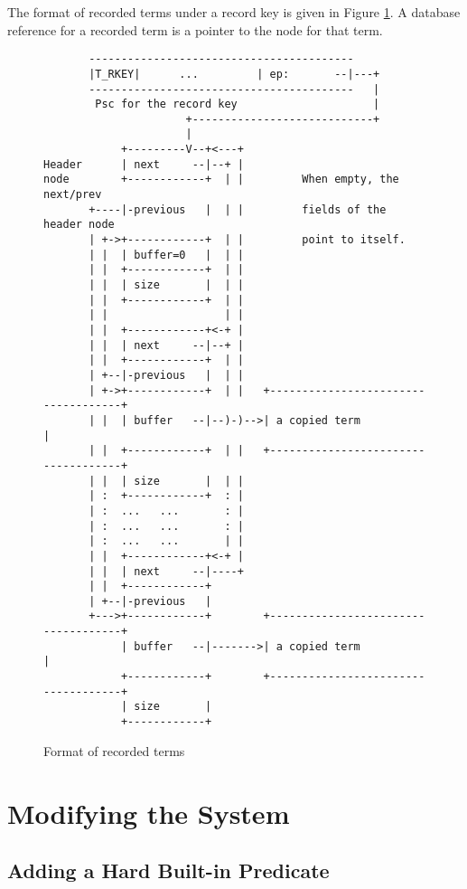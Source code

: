 \documentclass[11pt]{article}
\begin{document}
The format of recorded terms under a record key is given in Figure
\ref{f:record}.
A database reference for a recorded term
is a pointer to the node for that term.

\begin{figure}
\begin{verbatim}
       -----------------------------------------
       |T_RKEY|      ...         | ep:       --|---+
       -----------------------------------------   |
        Psc for the record key                     |
                      +----------------------------+
                      |
            +---------V--+<---+
Header      | next     --|--+ |
node        +------------+  | |         When empty, the next/prev
       +----|-previous   |  | |         fields of the header node
       | +->+------------+  | |         point to itself.
       | |  | buffer=0   |  | |
       | |  +------------+  | |
       | |  | size       |  | |
       | |  +------------+  | |
       | |                  | |
       | |  +------------+<-+ |
       | |  | next     --|--+ |
       | |  +------------+  | |
       | +--|-previous   |  | |
       | +->+------------+  | |   +------------------------------------+
       | |  | buffer   --|--)-)-->| a copied term                      |
       | |  +------------+  | |   +------------------------------------+
       | |  | size       |  | |
       | :  +------------+  : |
       | :  ...   ...       : |
       | :  ...   ...       : |
       | :  ...   ...       | |
       | |  +------------+<-+ |
       | |  | next     --|----+
       | |  +------------+  
       | +--|-previous   |
       +--->+------------+        +------------------------------------+
            | buffer   --|------->| a copied term                      |
            +------------+        +------------------------------------+
            | size       |
            +------------+  
\end{verbatim}
\caption{Format of recorded terms}
\label{f:record}
\end{figure}


\section{Modifying the System} \label{sec:modification}

\subsection{Adding a Hard Built-in Predicate}
\end{document}
